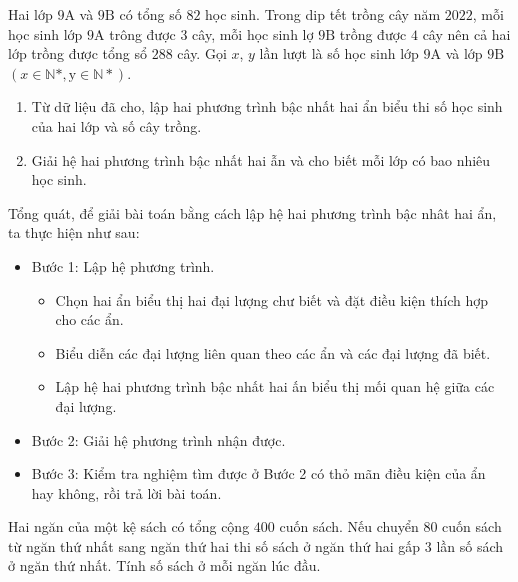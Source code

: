 \begin{vd}
	Hai lớp $9\mathrm{A}$ và $9\mathrm{B}$ có tổng số $82$ học sinh. Trong dip tết trồng cây năm $2022$, mỗi học sinh lớp $9\mathrm{A}$ trông được $3$ cây, mỗi học sinh lợ $9\mathrm{B}$ trồng được $4$ cây nên cả hai lớp trồng được tổng sổ $288$ cây. Gọi $x$, $y$ lần lượt là số học sinh lớp $9\mathrm{A}$ và lớp $9\mathrm{B}$ $\left(x\in\mathbb{N}*,\mathrm{y}\in\mathbb{N}*\right)$.
	\begin{enumerate}
	\item Từ dữ liệu đã cho, lập hai phương trình bậc nhất hai ẩn biểu thi số học sinh của hai lớp và số cây trồng.
	\item Giải hệ hai phương trình bậc nhất hai ẫn và cho biết mỗi lớp có bao nhiêu học sinh.
	\end{enumerate}
\end{vd}
Tổng quát, để giải bài toán bằng cách lập hệ hai phương trình bậc nhât hai ẩn, ta thực hiện như sau:
\begin{itemize}
	\item Bước 1: Lập hệ phương trình.
	\begin{itemize}
	\item Chọn hai ẩn biểu thị hai đại lượng chư biết và đặt điều kiện thích hợp cho các ẩn.
	\item Biểu diễn các đại lượng liên quan theo các ẩn và các đại lượng đã biết.
	\item Lập hệ hai phương trình bậc nhất hai ấn biểu thị mối quan hệ giữa các đại lượng.
	\end{itemize}
	\item Bước 2: Giải hệ phương trình nhận được.
	\item Bước 3: Kiểm tra nghiệm tìm được ở Bước 2 có thỏ mãn điều kiện của ẩn hay không, rồi trả lời bài toán.
\end{itemize}
\begin{vd}
	Hai ngăn của một kệ sách có tổng cộng $400$ cuốn sách. Nếu chuyển $80$ cuốn sách từ ngăn thứ nhất sang ngăn thứ hai thi số sách ở ngăn thứ hai gấp $3$ lần số sách ở ngăn thứ nhất. Tính số sách ở mỗi ngăn lúc đầu.
\end{vd}
